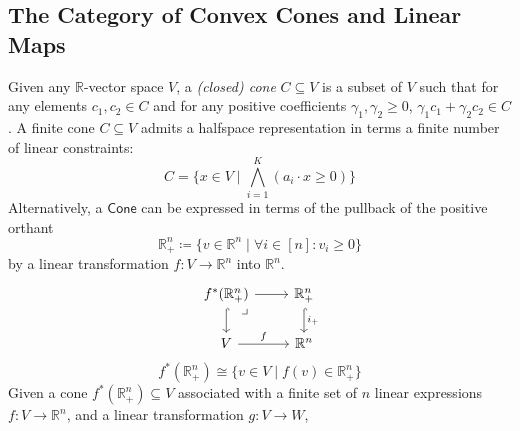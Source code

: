 \documentclass[10pt]{article}
\theoremstyle{definition}
\theoremstyle{remark}
\newcommand{\cone}{\mathsf{Cone}} %
\begin{document}
\clearpage
\subsection{The Category of Convex Cones and Linear Maps}

Given any $\mathbb{R}$-vector space $V$, a \textit{(closed) cone} $C \subseteq V$ is a subset of $V$ such that for any elements $c_1, c_2 \in C$ and for any positive coefficients $\gamma_1, \gamma_2 \geq 0$, $\gamma_1 c_1 + \gamma_2 c_2 \in C$. A finite cone $C \subseteq V$ admits a halfspace representation in terms a finite number of linear constraints:
\begin{equation}
    C = \{ x \in V \mid \bigwedge_{i=1}^{K} (a_i \cdot x \geq 0) \}
\end{equation}
Alternatively, a $\cone$ can be expressed in terms of the pullback of the positive orthant 
\begin{equation}
    \mathbb{R}_{+}^{n} \coloneqq \{v \in \mathbb{R}^n \mid \forall i \in [n]: v_i \geq 0 \}
\end{equation}
by a linear transformation $f : V \to \mathbb{R}^{n}$ into $\mathbb{R}^{n}$.
\begin{equation}
    \begin{tikzcd}
        f^{*}(\mathbb{R}^n_+) \ar[dr, phantom, "\lrcorner", very near start, xshift=-2mm] \ar[r] \ar[d, hook] &  \mathbb{R}^n_+ \ar[d, hook, "i_+"] \\
        V \ar[r, "f"] & \mathbb{R}^n
    \end{tikzcd}
\end{equation}
\begin{equation}
    f^{*}(\mathbb{R}^n_+) \cong \{ v \in V \mid f(v) \in \mathbb{R}^n_+ \}
\end{equation}
Given a cone $f^{*}(\mathbb{R}^n_+) \subseteq V$ associated with a finite set of $n$ linear expressions $f : V \to \mathbb{R}^n$, and a linear transformation $g : V \to W$,
\end{document}
